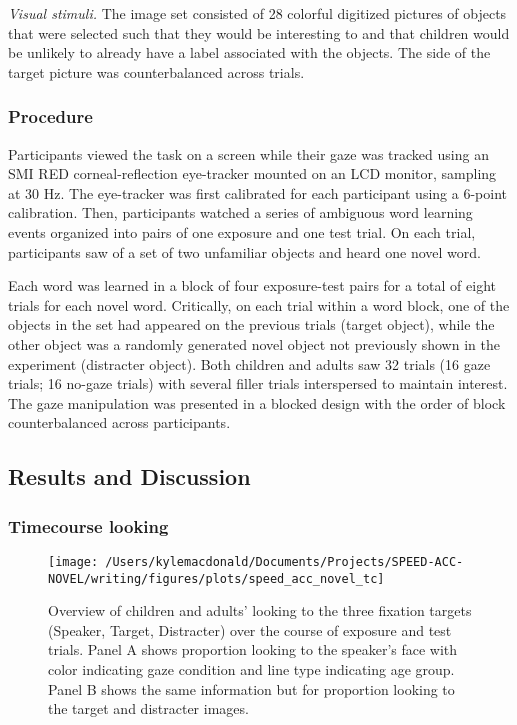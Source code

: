 \documentclass[man,floatsintext]{apa6}
\begin{document}
\emph{Visual stimuli.} The image set consisted of 28 colorful digitized
pictures of objects that were selected such that they would be
interesting to and that children would be unlikely to already have a
label associated with the objects. The side of the target picture was
counterbalanced across trials.

\subsubsection{Procedure}\label{procedure-2}

Participants viewed the task on a screen while their gaze was tracked
using an SMI RED corneal-reflection eye-tracker mounted on an LCD
monitor, sampling at 30 Hz. The eye-tracker was first calibrated for
each participant using a 6-point calibration. Then, participants watched
a series of ambiguous word learning events organized into pairs of one
exposure and one test trial. On each trial, participants saw of a set of
two unfamiliar objects and heard one novel word.

Each word was learned in a block of four exposure-test pairs for a total
of eight trials for each novel word. Critically, on each trial within a
word block, one of the objects in the set had appeared on the previous
trials (target object), while the other object was a randomly generated
novel object not previously shown in the experiment (distracter object).
Both children and adults saw 32 trials (16 gaze trials; 16 no-gaze
trials) with several filler trials interspersed to maintain interest.
The gaze manipulation was presented in a blocked design with the order
of block counterbalanced across participants.

\subsection{Results and Discussion}\label{results-and-discussion-2}

\subsubsection{Timecourse looking}\label{timecourse-looking}

\begin{figure}[!t]

{\centering \texttt{[image: /Users/kylemacdonald/Documents/Projects/SPEED-ACC-NOVEL/writing/figures/plots/speed\_acc\_novel\_tc]} 

}

\caption{Overview of children and adults' looking to the three fixation targets (Speaker, Target, Distracter) over the course of exposure and test trials. Panel A shows proportion looking to the speaker's face with color indicating gaze condition and line type indicating age group. Panel B shows the same information but for proportion looking to the target and distracter images.}\label{fig:san-tc-plot}
\end{figure}
\end{document}
